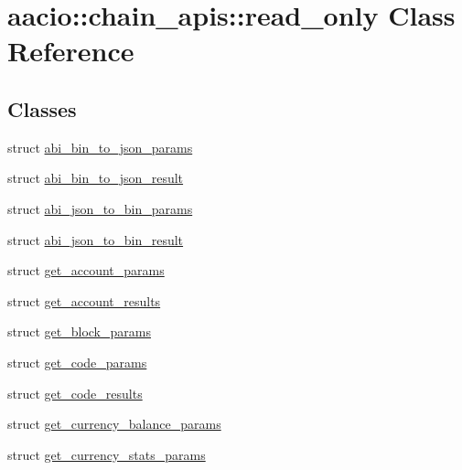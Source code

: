 \hypertarget{classaacio_1_1chain__apis_1_1read__only}{}\section{aacio\+:\+:chain\+\_\+apis\+:\+:read\+\_\+only Class Reference}
\label{classaacio_1_1chain__apis_1_1read__only}
\subsection*{Classes}
\begin{DoxyCompactItemize}
\item 
struct \mbox{\hyperlink{structaacio_1_1chain__apis_1_1read__only_1_1abi__bin__to__json__params}{abi\+\_\+bin\+\_\+to\+\_\+json\+\_\+params}}
\item 
struct \mbox{\hyperlink{structaacio_1_1chain__apis_1_1read__only_1_1abi__bin__to__json__result}{abi\+\_\+bin\+\_\+to\+\_\+json\+\_\+result}}
\item 
struct \mbox{\hyperlink{structaacio_1_1chain__apis_1_1read__only_1_1abi__json__to__bin__params}{abi\+\_\+json\+\_\+to\+\_\+bin\+\_\+params}}
\item 
struct \mbox{\hyperlink{structaacio_1_1chain__apis_1_1read__only_1_1abi__json__to__bin__result}{abi\+\_\+json\+\_\+to\+\_\+bin\+\_\+result}}
\item 
struct \mbox{\hyperlink{structaacio_1_1chain__apis_1_1read__only_1_1get__account__params}{get\+\_\+account\+\_\+params}}
\item 
struct \mbox{\hyperlink{structaacio_1_1chain__apis_1_1read__only_1_1get__account__results}{get\+\_\+account\+\_\+results}}
\item 
struct \mbox{\hyperlink{structaacio_1_1chain__apis_1_1read__only_1_1get__block__params}{get\+\_\+block\+\_\+params}}
\item 
struct \mbox{\hyperlink{structaacio_1_1chain__apis_1_1read__only_1_1get__code__params}{get\+\_\+code\+\_\+params}}
\item 
struct \mbox{\hyperlink{structaacio_1_1chain__apis_1_1read__only_1_1get__code__results}{get\+\_\+code\+\_\+results}}
\item 
struct \mbox{\hyperlink{structaacio_1_1chain__apis_1_1read__only_1_1get__currency__balance__params}{get\+\_\+currency\+\_\+balance\+\_\+params}}
\item 
struct \mbox{\hyperlink{structaacio_1_1chain__apis_1_1read__only_1_1get__currency__stats__params}{get\+\_\+currency\+\_\+stats\+\_\+params}}

\end{DoxyCompactItemize}
